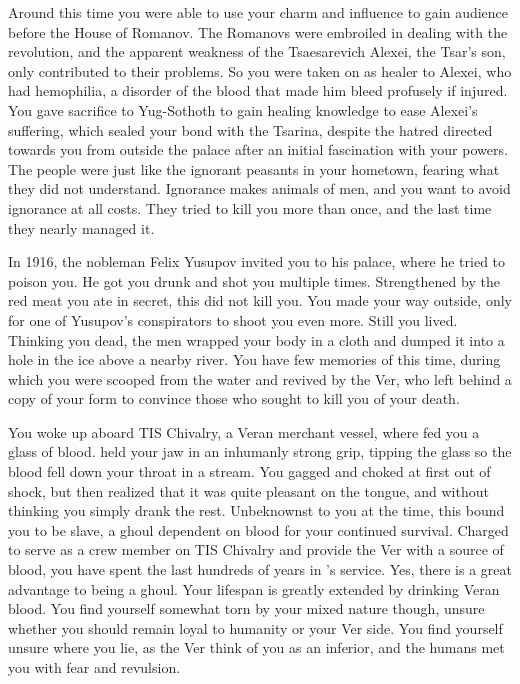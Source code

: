 \documentclass[char]{guildcamp4}
\begin{document}
Around this time you were able to use your charm and influence to gain audience before the House of Romanov. The Romanovs were embroiled in dealing with the revolution, and the apparent weakness of the Tsaesarevich Alexei, the Tsar's son, only contributed to their problems. So you were taken on as healer to Alexei, who had hemophilia, a disorder of the blood that made him bleed profusely if injured. You gave sacrifice to Yug-Sothoth to gain healing knowledge to ease Alexei's suffering, which sealed your bond with the Tsarina, despite the hatred directed towards you from outside the palace after an initial fascination with your powers. The people were just like the ignorant peasants in your hometown, fearing what they did not understand. Ignorance makes animals of men, and you want to avoid ignorance at all costs. They tried to kill you more than once, and the last time they nearly managed it.

In 1916, the nobleman Felix Yusupov invited you to his palace, where he tried to poison you. He got you drunk and shot you multiple times. Strengthened by the red meat you ate in secret, this did not kill you. You made your way outside, only for one of Yusupov's conspirators to shoot you even more. Still you lived. Thinking you dead, the men wrapped your body in a cloth and dumped it into a hole in the ice above a nearby river. You have few memories of this time, during which you were scooped from the water and revived by the Ver, who left behind a copy of your form to convince those who sought to kill you of your death.

You woke up aboard TIS Chivalry, a Veran merchant vessel, where \cVone{} fed you a glass of \cVone{\their} blood. \cVone{\They} held your jaw in an inhumanly strong grip, tipping the glass so the blood fell down your throat in a stream. You gagged and choked at first out of shock, but then realized that it was quite pleasant on the tongue, and without thinking you simply drank the rest. Unbeknownst to you at the time, this bound you to be \cVone{\their} slave, a ghoul dependent on \cVone{\their} blood for your continued survival. Charged to serve as a crew member on TIS Chivalry and provide the Ver with a source of blood, you have spent the last hundreds of years in \cVone{}'s service. Yes, there is a great advantage to being a ghoul. Your lifespan is greatly extended by drinking Veran blood. You find yourself somewhat torn by your mixed nature though, unsure whether you should remain loyal to humanity or your Ver side. You find yourself unsure where you lie, as the Ver think of you as an inferior, and the humans met you with fear and revulsion.
\end{document}
